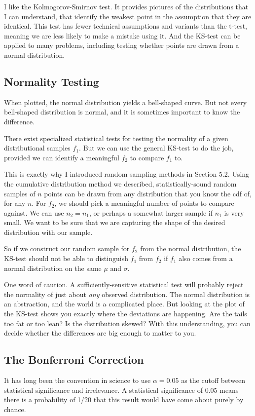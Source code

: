 \documentclass[10pt]{article}
\begin{document}
I like the Kolmogorov-Smirnov test. It provides pictures of the distributions that I can understand, that identify the weakest point in the assumption that they are identical. This test has fewer technical assumptions and variants than the t-test, meaning we are less likely to make a mistake using it. And the KS-test can be applied to many problems, including testing whether points are drawn from a normal distribution.

\subsection{Normality Testing}
When plotted, the normal distribution yields a bell-shaped curve. But not every bell-shaped distribution is normal, and it is sometimes important to know the difference.

There exist specialized statistical tests for testing the normality of a given distributional samples \( f_{1} \). But we can use the general KS-test to do the job, provided we can identify a meaningful \( f_{2} \) to compare \( f_{1} \) to.

This is exactly why I introduced random sampling methods in Section 5.2. Using the cumulative distribution method we described, statistically-sound random samples of \( n \) points can be drawn from any distribution that you know the cdf of, for any \( n \). For \( f_{2} \), we should pick a meaningful number of points to compare against. We can use \( n_{2} = n_{1} \), or perhaps a somewhat larger sample if \( n_{1} \) is very small. We want to be sure that we are capturing the shape of the desired distribution with our sample.

So if we construct our random sample for \( f_{2} \) from the normal distribution, the KS-test should not be able to distinguish \( f_{1} \) from \( f_{2} \) if \( f_{1} \) also comes from a normal distribution on the same \( \mu \) and \( \sigma \).

One word of caution. A sufficiently-sensitive statistical test will probably reject the normality of just about \textit{any} observed distribution. The normal distribution is an abstraction, and the world is a complicated place. But looking at the plot of the KS-test shows you exactly where the deviations are happening. Are the tails too fat or too lean? Is the distribution skewed? With this understanding, you can decide whether the differences are big enough to matter to you.

\subsection{The Bonferroni Correction}
It has long been the convention in science to use \( \alpha = 0.05 \) as the cutoff between statistical significance and irrelevance. A statistical significance of 0.05 means there is a probability of 1/20 that this result would have come about purely by chance.
\end{document}
